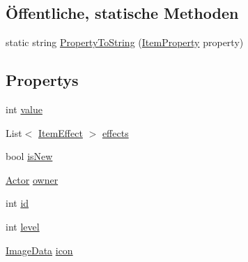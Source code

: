 \subsection*{Öffentliche, statische Methoden}
\begin{DoxyCompactItemize}
\item 
static string \hyperlink{class_gruppe22_1_1_backend_1_1_item_a2de47879fd8a86657fbb432d530bdc5b}{Property\-To\-String} (\hyperlink{namespace_gruppe22_1_1_backend_a0bab4fb79b71059941f85a901606a7df}{Item\-Property} property)
\end{DoxyCompactItemize}
\subsection*{Propertys}
\begin{DoxyCompactItemize}
\item 
int \hyperlink{class_gruppe22_1_1_backend_1_1_item_a738eaf9f7acc989f8885f4973aab6804}{value}
\item 
List$<$ \hyperlink{class_gruppe22_1_1_backend_1_1_item_effect}{Item\-Effect} $>$ \hyperlink{class_gruppe22_1_1_backend_1_1_item_a30f03b39159c6f65e569eb492d878f90}{effects}
\item 
bool \hyperlink{class_gruppe22_1_1_backend_1_1_item_a156f66cff295f593717be085a454234d}{is\-New}
\item 
\hyperlink{class_gruppe22_1_1_backend_1_1_actor}{Actor} \hyperlink{class_gruppe22_1_1_backend_1_1_item_af11a242f1a41cad4717d05e4006b6b22}{owner}
\item 
int \hyperlink{class_gruppe22_1_1_backend_1_1_item_a26fab2d08c72dffe7e431182f395bc16}{id}
\item 
int \hyperlink{class_gruppe22_1_1_backend_1_1_item_a0139f617006079f108967a3f06554f4c}{level}
\item 
\hyperlink{class_gruppe22_1_1_backend_1_1_image_data}{Image\-Data} \hyperlink{class_gruppe22_1_1_backend_1_1_item_a83b9b5f8ad0469d97ff596af764f4208}{icon}

\end{DoxyCompactItemize}
